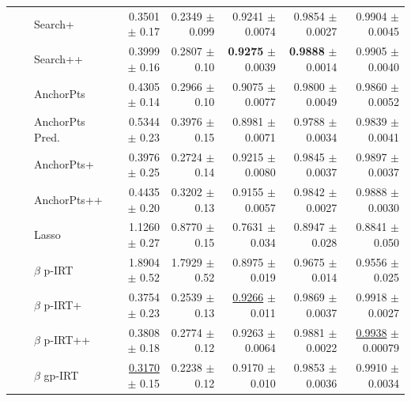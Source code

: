 \begin{longtable}{llp{}rrrrr}
 &  & Search+ & 0.3501 {\scriptsize $\pm$ 0.17} & 0.2349 {\scriptsize $\pm$ 0.099} & 0.9241 {\scriptsize $\pm$ 0.0074} & 0.9854 {\scriptsize $\pm$ 0.0027} & 0.9904 {\scriptsize $\pm$ 0.0045} \\
 &  & Search++ & 0.3999 {\scriptsize $\pm$ 0.16} & 0.2807 {\scriptsize $\pm$ 0.10} & \textbf{0.9275} {\scriptsize $\pm$ 0.0039} & \textbf{0.9888} {\scriptsize $\pm$ 0.0014} & 0.9905 {\scriptsize $\pm$ 0.0040} \\
 &  & AnchorPts & 0.4305 {\scriptsize $\pm$ 0.14} & 0.2966 {\scriptsize $\pm$ 0.10} & 0.9075 {\scriptsize $\pm$ 0.0077} & 0.9800 {\scriptsize $\pm$ 0.0049} & 0.9860 {\scriptsize $\pm$ 0.0052} \\
 &  & AnchorPts Pred. & 0.5344 {\scriptsize $\pm$ 0.23} & 0.3976 {\scriptsize $\pm$ 0.15} & 0.8981 {\scriptsize $\pm$ 0.0071} & 0.9788 {\scriptsize $\pm$ 0.0034} & 0.9839 {\scriptsize $\pm$ 0.0041} \\
 &  & AnchorPts+ & 0.3976 {\scriptsize $\pm$ 0.25} & 0.2724 {\scriptsize $\pm$ 0.14} & 0.9215 {\scriptsize $\pm$ 0.0080} & 0.9845 {\scriptsize $\pm$ 0.0037} & 0.9897 {\scriptsize $\pm$ 0.0037} \\
 &  & AnchorPts++ & 0.4435 {\scriptsize $\pm$ 0.20} & 0.3202 {\scriptsize $\pm$ 0.13} & 0.9155 {\scriptsize $\pm$ 0.0057} & 0.9842 {\scriptsize $\pm$ 0.0027} & 0.9888 {\scriptsize $\pm$ 0.0030} \\
 &  & Lasso & 1.1260 {\scriptsize $\pm$ 0.27} & 0.8770 {\scriptsize $\pm$ 0.15} & 0.7631 {\scriptsize $\pm$ 0.034} & 0.8947 {\scriptsize $\pm$ 0.028} & 0.8841 {\scriptsize $\pm$ 0.050} \\
 &  & $\beta$ p-IRT & 1.8904 {\scriptsize $\pm$ 0.52} & 1.7929 {\scriptsize $\pm$ 0.52} & 0.8975 {\scriptsize $\pm$ 0.019} & 0.9675 {\scriptsize $\pm$ 0.014} & 0.9556 {\scriptsize $\pm$ 0.025} \\
 &  & $\beta$ p-IRT+ & 0.3754 {\scriptsize $\pm$ 0.23} & 0.2539 {\scriptsize $\pm$ 0.13} & \underline{0.9266} {\scriptsize $\pm$ 0.011} & 0.9869 {\scriptsize $\pm$ 0.0037} & 0.9918 {\scriptsize $\pm$ 0.0027} \\
 &  & $\beta$ p-IRT++ & 0.3808 {\scriptsize $\pm$ 0.18} & 0.2774 {\scriptsize $\pm$ 0.12} & 0.9263 {\scriptsize $\pm$ 0.0064} & 0.9881 {\scriptsize $\pm$ 0.0022} & \underline{0.9938} {\scriptsize $\pm$ 0.00079} \\
 &  & $\beta$ gp-IRT & \underline{0.3170} {\scriptsize $\pm$ 0.15} & 0.2238 {\scriptsize $\pm$ 0.12} & 0.9170 {\scriptsize $\pm$ 0.010} & 0.9853 {\scriptsize $\pm$ 0.0036} & 0.9910 {\scriptsize $\pm$ 0.0034} \\

\end{longtable}
